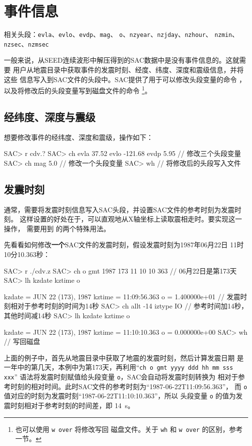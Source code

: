 \section{事件信息}
\label{sec:event-info}
相关头段：\texttt{evla}、\texttt{evlo}、\texttt{evdp}、\texttt{mag}、
    \texttt{o}、\texttt{nzyear}、\texttt{nzjday}、\texttt{nzhour}、
    \texttt{nzmin}、\texttt{nzsec}、\texttt{nzmsec}

一般来说，从SEED连续波形中解压得到的SAC数据中是没有事件信息的。这就需要
用户从地震目录中获取事件的发震时刻、经度、纬度、深度和震级信息，并将这些
信息写入到SAC文件的头段中。SAC提供了用于可以修改头段变量的命令
，以及将修改后的头段变量写到磁盘文件的命令
\footnote{也可以使用 \texttt{w over} 将修改写回
磁盘文件。关于 \texttt{wh} 和 \texttt{w over} 的区别，参考
 一节。}。

\subsection{经纬度、深度与震级}
想要修改事件的经纬度、深度和震级，操作如下：
\begin{SACCode}
SAC> r cdv.?
SAC> ch evla 37.52 evlo -121.68 evdp 5.95   // 修改三个头段变量
SAC> ch mag 5.0                             // 修改一个头段变量
SAC> wh                                     // 将修改后的头段写入文件
\end{SACCode}

\subsection{发震时刻}
通常，需要将发震时刻信息写入SAC头段，并设置SAC文件的参考时刻为发震时刻。
这样设置的好处在于，可以直观地从X轴坐标上读取震相走时。要实现这一操作，
需要用到  的两个特殊用法。

先看看如何修改\textbf{一个}SAC文件的发震时刻，假设发震时刻为1987年06月22日
11时10分10.363秒：
\label{code:origin-time}
\begin{SACCode}
SAC> r ./cdv.z
SAC> ch o gmt 1987 173 11 10 10 363   // 06月22日是第173天
SAC> lh kzdate kztime o

     kzdate = JUN 22 (173), 1987
     kztime = 11:09:56.363
          o = 1.400000e+01       // 发震时刻相对于参考时刻的时间为14秒
SAC> ch allt -14 iztype IO       // 参考时间加14秒，其他时间减14秒
SAC> lh kzdate kztime o

     kzdate = JUN 22 (173), 1987
     kztime = 11:10:10.363
          o = 0.000000e+00
SAC> wh                          // 写回磁盘
\end{SACCode}
上面的例子中，首先从地震目录中获取了地震的发震时刻，然后计算发震日期
是一年中的第几天，本例中为第173天，再利用``\texttt{ch o gmt yyyy ddd hh mm sss xxx}''
语法将发震时刻赋值给头段变量 \texttt{o}，SAC会自动将发震时刻转换为
相对于参考时刻的相对时间。此时SAC文件的参考时刻为``1987-06-22T11:09:56.363''，
而 \texttt{o} 值对应的时刻为发震时刻``1987-06-22T11:10:10.363''，所以
头段变量 \texttt{o} 的值为发震时刻相对于参考时刻的时间差，即 \SI{14}{\s}。

